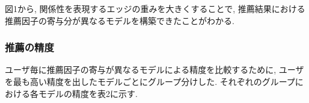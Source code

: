 \documentclass[a4j,11pt]{jarticle}           %
\begin{document}

	図1から, 関係性を表現するエッジの重みを大きくすることで, 推薦結果における推薦因子の寄与分が異なるモデルを構築できたことがわかる. %
	\subsubsection{推薦の精度}
	ユーザ毎に推薦因子の寄与が異なるモデルによる精度を比較するために, ユーザを最も高い精度を出したモデルごとにグループ分けした. それぞれのグループにおける各モデルの精度を表2に示す.
	
\end{document}
